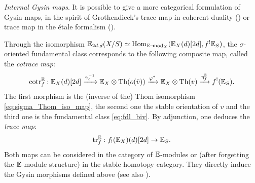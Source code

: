 \begin{num}\textit{Internal Gysin maps}. It is possible to give a more categorical
 formulation of Gysin maps, in the spirit of Grothendieck's trace map in coherent duality
 (\cite[III, Th. 10.5]{Hart}) or trace map in the \'etale formalism (\cite[XVIII, Th. 2.9]{SGA4}).

Through the isomorphism $\mathbb E_{2d,d}(X/S) \simeq \operatorname{Hom}_{\mathbb E\!-\!\operatorname{mod}_X}(\mathbb E_X(d)[2d],f^!\mathbb E_S)$,
 the $\sigma$-oriented fundamental class corresponds to the following composite map,
 called the \emph{cotrace map}:
\begin{equation}\label{eq:cotrace}
\mathrm{cotr}_f^\mathbb E:\mathbb E_X(d)[2d] \xrightarrow{\gamma_{\tilde v}^{-1}} \mathbb E_X\otimes \operatorname{Th}(o(\tilde v))\xrightarrow{\varphi^*}\mathbb E_X \otimes \operatorname{Th}(v)
 \xrightarrow{\eta_f^\mathbb E} f^!(\mathbb E_S).
\end{equation}
The first morphism is the (inverse of the) Thom isomorphism \eqref{eq:sigma_Thom_iso_map}, the second one the stable orientation of $v$
 and the third one is the fundamental class \eqref{eq:fdl_biv}.
 By adjunction, one deduces the \emph{trace map}:
\begin{equation}\label{eq:trace}
\mathrm{tr}_f^\mathbb E:f_!(\mathbb E_X)(d)[2d] \rightarrow \mathbb E_S.
\end{equation}
Both maps can be considered in the category of $\mathbb E$-modules or
 (after forgetting the $\mathbb E$-module structure) in the stable homotopy category.
 They directly induce the Gysin morphisms defined above
 (see also \cite[]{DJK}).
\end{num}

%
%

